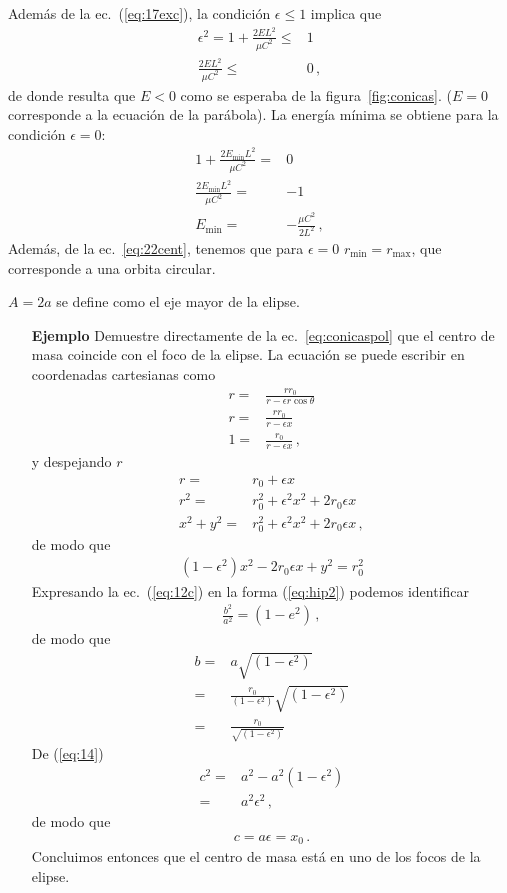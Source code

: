 Además de la ec.~(\ref{eq:17exc}), la condición $\epsilon\le 1$ implica que
\begin{align}
  \epsilon^2=1+\frac{2EL^2}{\mu C^2}\le&1\nonumber\\
  \frac{2EL^2}{\mu C^2}\le&0\,,
\end{align}
de donde resulta que $E<0$ como se esperaba de la figura~\ref{fig:conicas}. ($E=0$ corresponde a la ecuación de la parábola). La energía mínima se obtiene para la condición $\epsilon=0$:
\begin{align}
  1+\frac{2E_{\text{min}}L^2}{\mu C^2}=&0\nonumber\\
  \frac{2E_{\text{min}}L^2}{\mu C^2}=&-1\nonumber\\
  E_{\text{min}}=&-\frac{\mu C^2}{2L^2}\,,
\end{align}
Además, de la ec.~\eqref{eq:22cent}, tenemos que para $\epsilon=0$ $r_{\text{min}}=r_{\text{max}}$, que corresponde a una orbita circular.

$A=2a$ se define como el eje mayor de la elipse. 

\begin{itemize}
\item[\textbf{Ejemplo}] Demuestre directamente de la ec.~\eqref{eq:conicaspol} que  
el centro de masa coincide con el foco de la elipse.  
La ecuación se puede escribir en coordenadas cartesianas como
\begin{align}
  r=&\frac{r r_0}{r-\epsilon r\cos\theta}\nonumber\\
  r=&\frac{r r_0}{r-\epsilon x}\nonumber\\
  1=&\frac{r_0}{r-\epsilon x}\,,
\end{align}
y despejando $r$
\begin{align}
  r=&r_0+\epsilon x\nonumber\\
  r^2=&r_0^2+\epsilon^2 x^2+2r_0\epsilon x\nonumber\\
  x^2+y^2=&r_0^2+\epsilon^2 x^2+2r_0\epsilon x\,,
\end{align}
de modo que
\begin{align}
  \label{eq:12c}
  (1-\epsilon^2)x^2-2 r_0 \epsilon x +y^2=r_0^2
\end{align}
Expresando la ec.~(\ref{eq:12c}) en la forma (\ref{eq:hip2}) podemos identificar
\begin{align}
  \frac{b^2}{a^2}=(1-e^2)\,,
\end{align}
 de modo que
 \begin{align}
   \label{eq:18}
   b=&a\sqrt{(1-\epsilon^2)}\nonumber\\
   =&\frac{r_0}{(1-\epsilon^2)}\sqrt{(1-\epsilon^2)}\nonumber\\
   =&\frac{r_0}{\sqrt{(1-\epsilon^2)}}
 \end{align}
De (\ref{eq:14})
\begin{align}
  c^2=&a^2-a^2(1-\epsilon^2)\nonumber\\
  =&a^2\epsilon^2\,,
\end{align}
de modo que
\begin{align}
  c=a \epsilon=x_0\,.
\end{align}
Concluimos entonces que el centro de masa está en uno de los focos de la elipse.

\end{itemize}


